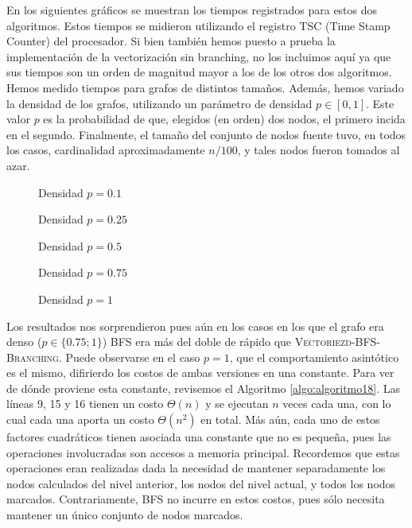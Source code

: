 En los siguientes gráficos se muestran los tiempos registrados para estos dos algoritmos. Estos tiempos se midieron utilizando el registro TSC (Time Stamp Counter) del procesador. Si bien también hemos puesto a prueba la implementación de la vectorización sin branching, no los incluimos aquí ya que sus tiempos son un orden de magnitud mayor a los de los otros dos algoritmos. Hemos medido tiempos para grafos de distintos tamaños. Además, hemos variado la densidad de los grafos, utilizando un parámetro de densidad $p \in [0, 1]$. Este valor $p$ es la probabilidad de que, elegidos (en orden) dos nodos, el primero incida en el segundo. Finalmente, el tamaño del conjunto de nodos fuente tuvo, en todos los casos, cardinalidad aproximadamente $n / 100$, y tales nodos fueron tomados al azar.

\begin{figure}[H]
\centering

\caption{Densidad $p = 0.1$}
\end{figure}

\begin{figure}[H]
\centering

\caption{Densidad $p = 0.25$}
\end{figure}

\begin{figure}[H]
\centering

\caption{Densidad $p = 0.5$}
\end{figure}

\begin{figure}[H]
\centering

\caption{Densidad $p = 0.75$}
\end{figure}

\begin{figure}[H]
\centering

\caption{Densidad $p = 1$}
\end{figure}

Los resultados nos sorprendieron pues aún en los casos en los que el grafo era denso ($p \in \{0.75; 1\}$) \textsc{BFS} era más del doble de rápido que \textsc{Vectoriezd-BFS-Branching}. Puede observarse en el caso $p = 1$, que el comportamiento asintótico es el mismo, difirierdo los costos de ambas versiones en una constante. Para ver de dónde proviene esta constante, revisemos el Algoritmo \ref{algo:algoritmo18}. Las líneas 9, 15 y 16 tienen un costo $\Theta(n)$ y se ejecutan $n$ veces cada una, con lo cual cada una aporta un costo $\Theta(n^2)$ en total. Más aún, cada uno de estos factores cuadráticos tienen asociada una constante que no es pequeña, pues las operaciones involucradas son accesos a memoria principal. Recordemos que estas operaciones eran realizadas dada la necesidad de mantener separadamente los nodos calculados del nivel anterior, los nodos del nivel actual, y todos los nodos marcados. Contrariamente, \textsc{BFS} no incurre en estos costos, pues sólo necesita mantener un único conjunto de nodos marcados.